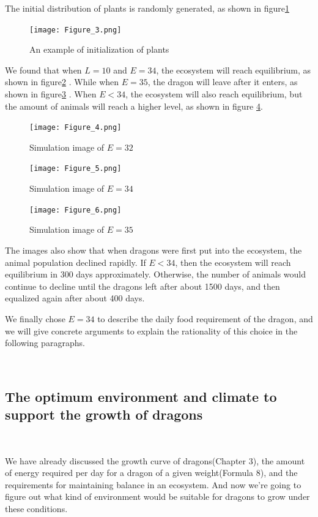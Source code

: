 \documentclass{mcmthesis}
\begin{document}
The initial distribution of plants is randomly generated, as shown in figure\ref{fig:simulate2}
\begin{figure}[h]
    \centering
    \texttt{[image: Figure\_3.png]}
    \caption{An example of initialization of plants}\label{fig:simulate2}
\end{figure}

We found that when $L = 10$ and $E = 34$, the ecosystem will reach equilibrium, as shown in figure\ref{fig:simulate3} . While when $E = 35$, the dragon will leave after it enters, as shown in figure\ref{fig:simulate4} . When $E < 34$, the ecosystem will also reach equilibrium, but the amount of animals will reach a higher level, as shown in figure \ref{fig:simulate5}.\\

\begin{figure}[h]
    \centering
    \texttt{[image: Figure\_4.png]}
    \caption{Simulation image of $E=32$}\label{fig:simulate3}
\end{figure}
\begin{figure}[t]
    \centering
    \texttt{[image: Figure\_5.png]}
    \caption{Simulation image of $E=34$}\label{fig:simulate4}
\end{figure}
\begin{figure}[t]
    \centering
    \texttt{[image: Figure\_6.png]}
    \caption{Simulation image of $E=35$}\label{fig:simulate5}
\end{figure}
The images also show that when dragons were first put into the ecosystem, the animal population declined rapidly. If $E<34$, then the ecosystem will reach equilibrium in 300 days approximately. Otherwise, the number of animals would continue to decline until the dragons left after about 1500 days, and then equalized again after about 400 days.

We finally chose $E=34$ to describe the daily food requirement of the dragon, and we will give concrete arguments to explain the rationality of this choice in the following paragraphs.


~\ \
\subsection{The optimum environment and climate to support the growth of dragons}
~\ \

We have already discussed the growth curve of dragons(Chapter 3), the amount of energy required per day for a dragon of a given weight(Formula 8), and the requirements for maintaining balance in an ecosystem. And now we're going  to figure out what kind of environment would be suitable for dragons to grow under these conditions.
\end{document}
